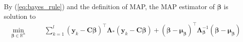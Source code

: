 \documentclass[a4paper, 11pt]{article}
\newcommand{\R}{\mathbb{R}}
\newcommand{\1}{\mathbf{1}}
\DeclareMathOperator*{\argmin}{argmin}
\newcommand{\PNS}{\mathpzc{P}}
\newcommand{\xb}{\mathbf{x}}
\newcommand{\yb}{\mathbf{y}}
\newcommand{\zb}{\mathbf{z}}
\newcommand{\Ib}{\mathbf{I}}
\newcommand{\Ab}{\mathbf{A}}
\newcommand{\Cb}{\mathbf{C}}
\newcommand{\lambdab}{{\bm \lambda}}
\newcommand{\betab}{\bm{\beta}}
\newcommand{\mub}{\bm{\mu}}
\newcommand{\Lambdab}{\bm{\Lambda}}
\newcommand{\betamapns}{\hat{\betab}_{\textnormal{map}}}
\newcommand{\emapns}{\mathbf{E}_{\textnormal{map}}}
\newcommand{\bmapns}{\mathbf{b}_{\textnormal{map}}}
\begin{document}
{	%
	By (\ref{eq:bayes_rule}) and the definition of MAP, the MAP estimator of $\betab$ is solution to
	{
		\begin{equation} \label{eq:map_opt}
		\begin{aligned}
		\min_{\betab\in\R^n}\qquad &  \sum\limits_{k=1}^l(\yb_k-\Cb\betab)^\top\Lambdab_\ast (\yb_k-\Cb\betab) +(\betab-\mub_{\betab})^\top\Lambdab_{\betab}^{-1}(\betab-\mub_{\betab})\\

\end{aligned}
\end{equation}}}
\end{document}
